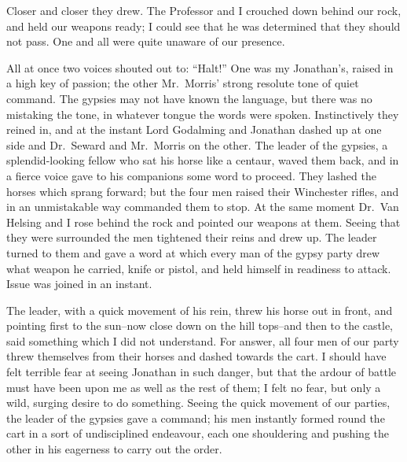\documentclass[12pt,openright]{book}
\begin{document}
Closer and closer they drew. The Professor and I crouched down behind our rock, and held our weapons ready; I could see that he was determined that they should not pass. One and all were quite unaware of our presence.

All at once two voices shouted out to: “Halt!” One was my Jonathan’s, raised in a high key of passion; the other Mr. Morris’ strong resolute tone of quiet command. The gypsies may not have known the language, but there was no mistaking the tone, in whatever tongue the words were spoken. Instinctively they reined in, and at the instant Lord Godalming and Jonathan dashed up at one side and Dr. Seward and Mr. Morris on the other. The leader of the gypsies, a splendid-looking fellow who sat his horse like a centaur, waved them back, and in a fierce voice gave to his companions some word to proceed. They lashed the horses which sprang forward; but the four men raised their Winchester rifles, and in an unmistakable way commanded them to stop. At the same moment Dr. Van Helsing and I rose behind the rock and pointed our weapons at them. Seeing that they were surrounded the men tightened their reins and drew up. The leader turned to them and gave a word at which every man of the gypsy party drew what weapon he carried, knife or pistol, and held himself in readiness to attack. Issue was joined in an instant.

The leader, with a quick movement of his rein, threw his horse out in front, and pointing first to the sun–now close down on the hill tops–and then to the castle, said something which I did not understand. For answer, all four men of our party threw themselves from their horses and dashed towards the cart. I should have felt terrible fear at seeing Jonathan in such danger, but that the ardour of battle must have been upon me as well as the rest of them; I felt no fear, but only a wild, surging desire to do something. Seeing the quick movement of our parties, the leader of the gypsies gave a command; his men instantly formed round the cart in a sort of undisciplined endeavour, each one shouldering and pushing the other in his eagerness to carry out the order.
\end{document}
